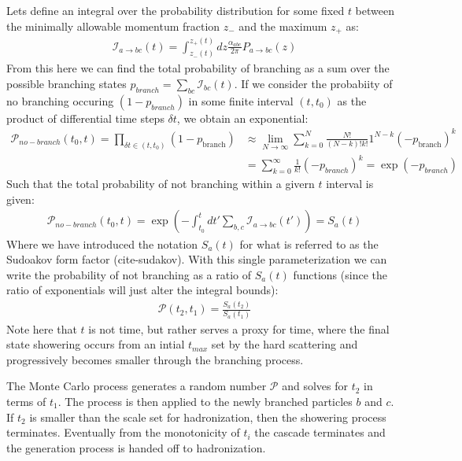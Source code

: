 Lets define an integral over the probability distribution for some fixed $t$ between the
minimally allowable momentum fraction $z_{-}$ and the maximum $z_{+}$ as:
\begin{align*}
\mathcal{I}_{a \rightarrow bc} (t) = \int_{z_{-}(t)}^{z_{+}(t)} dz \frac{\alpha_{abc}}{2\pi} P_{a\rightarrow bc} (z) 
\end{align*}
From this here we can find the total probability of branching as a sum over the
possible branching states $p_{branch} = \sum_{bc} \mathcal{I}_{bc}(t)$. If we consider the probabiity of no branching occuring $(1-p_{branch})$ in some finite
interval $(t,t_0)$ as the product of differential time steps $\delta t$, we obtain an exponential:
\begin{align*}
\mathcal{P}_{no-branch}(t_0,t) = \prod_{\delta t \in (t,t_0)} (1-p_{\text{branch}}) &\approx \lim_{N\rightarrow \infty} 
\sum_{k=0}^{N} \frac{N!}{(N-k)!k!} 1^{N-k}(-p_{\text{branch}})^k  \\
&= \sum_{k=0}^{\infty} \frac{1}{k!} (-p_{branch})^k = \exp{(-p_{branch})}
\end{align*}
Such that the total probability of not branching within a givern $t$ interval is given:
\begin{align*}
\mathcal{P}_{no-branch}(t_0,t) = 
\exp { \left ( - \int_{t_0}^{t} dt' \sum_{b,c} \mathcal{I}_{a\rightarrow bc} (t')   \right )} = S_{a}(t)
\end{align*}
Where we have introduced the notation $S_a(t)$ for what is referred to as the Sudoakov form 
factor (cite-sudakov). With this single parameterization we can write the probability of not branching as a ratio of $S_a(t)$ functions (since the ratio of exponentials will just alter the integral bounds):
\begin{align*}
\mathcal{P}(t_2, t_1) = \frac{S_a(t_{2})}{S_a(t_1)}
\end{align*}
Note here that $t$ is not time, but rather serves a proxy for time, where the
final state showering occurs from an intial $t_{max}$ set by the hard scattering and progressively becomes smaller through the branching process.   

The Monte Carlo process generates a random number $\mathcal{P}$ and solves for $t_2$ in terms
of $t_1$. The process is then applied to the newly branched particles $b$ and $c$. If $t_2$ is smaller than the scale
 set for hadronization, then the showering process terminates. Eventually from the monotonicity of $t_i$ the cascade
terminates and the generation process is handed off to hadronization.

